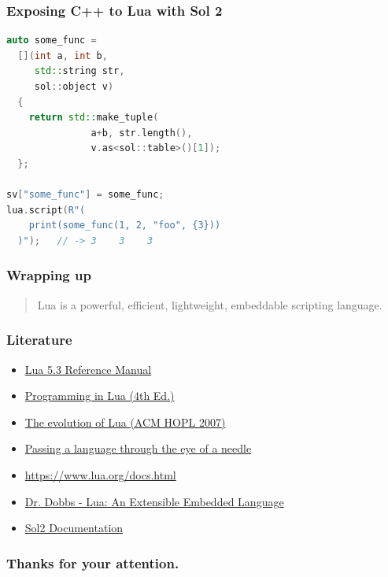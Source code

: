 \documentclass{beamer}
\begin{document}
\begin{frame}[fragile]
  \frametitle{Exposing C++ to Lua with Sol 2}

  \begin{lstlisting}[language={C++}]
auto some_func =
  [](int a, int b,
     std::string str,
     sol::object v)
  {
    return std::make_tuple(
               a+b, str.length(),
               v.as<sol::table>()[1]);
  };

sv["some_func"] = some_func;
lua.script(R"(
    print(some_func(1, 2, "foo", {3}))
  )");   // -> 3    3    3  
  \end{lstlisting}
\end{frame}


\begin{frame}
  \frametitle{Wrapping up}

  \begin{quote}Lua is a powerful, efficient, lightweight, embeddable scripting language.\end{quote}
\end{frame}

\begin{frame}
  \frametitle{Literature}

  \begin{itemize}
  \item \href{https://www.lua.org/manual/5.3/}{Lua 5.3 Reference Manual}
  \item \href{https://www.lua.org/pil/}{Programming in Lua (4th Ed.)}
  \item \href{https://www.lua.org/doc/hopl.pdf}{The evolution of Lua (ACM HOPL 2007)}
  \item \href{https://dl.acm.org/citation.cfm?id=1983083}{Passing a language through the eye of a needle}
  \item \href{https://www.lua.org/docs.html}{https://www.lua.org/docs.html}
  \end{itemize}

  \begin{itemize}
  \item \href{http://www.drdobbs.com/open-source/lua-an-extensible-embedded-language/184410014}{Dr. Dobbs - Lua: An Extensible Embedded Language}
  \item \href{http://sol2.readthedocs.io/en/latest/index.html}{Sol2 Documentation}
  \end{itemize}
\end{frame}

\begin{frame}
  \frametitle{Thanks for your attention.}
\end{frame}
\end{document}
